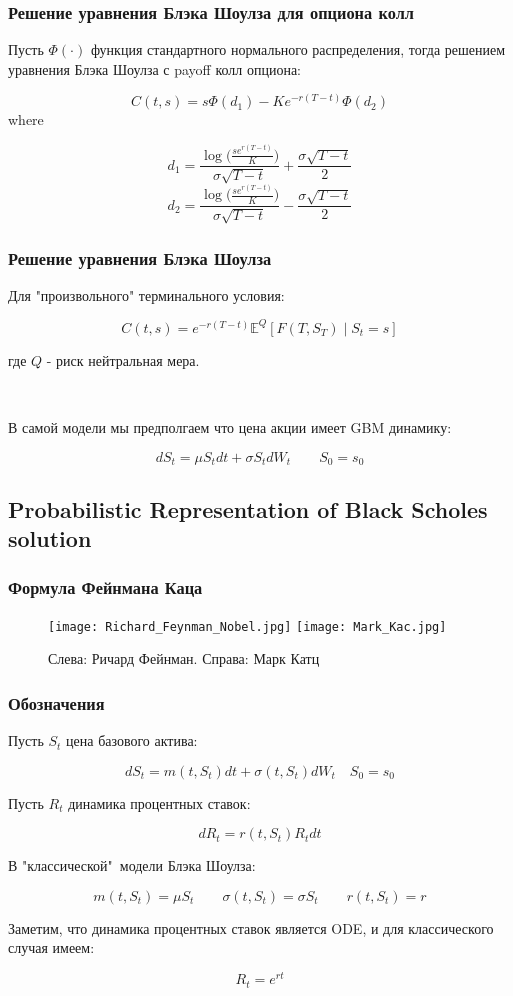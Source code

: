 \documentclass{beamer}
\begin{document}
\begin{frame}
\frametitle{Решение уравнения Блэка Шоулза для опциона колл}

Пусть $\Phi(\cdot)$ функция стандартного нормального распределения, тогда решением уравнения Блэка Шоулза с payoff колл опциона:

\[
C(t, s) = s \Phi(d_1) - K e^{-r(T - t)} \Phi(d_2)
\]
where

\[
d_1 = \frac{\log \bigg(\frac{s e^{r(T - t)}}{K}\bigg)}{\sigma \sqrt{T - t}} + \frac{\sigma \sqrt{T - t}}{2} 
\]
\[
d_2 = \frac{\log \bigg(\frac{s e^{r(T - t)}}{K}\bigg)}{\sigma \sqrt{T - t}} - \frac{\sigma \sqrt{T - t}}{2} 
\]

\end{frame}

\begin{frame}
\frametitle{Решение уравнения Блэка Шоулза}

Для "произвольного" терминального условия:

\[
C(t, s) = e^{-r(T-t)} \mathbb{E}^Q[F(T, S_T) \mid S_t = s]
\]

где \(Q\) - риск нейтральная мера.

\,

В самой модели мы предполгаем что цена акции имеет GBM динамику:

\[
d S_t = \mu S_t dt + \sigma S_t d W_t \quad \quad S_0 = s_0
\]

\end{frame}


\subsection{Probabilistic Representation of Black Scholes solution}
\begin{frame}
\frametitle{Формула Фейнмана Каца}
\begin{figure}
    \centering
    \texttt{[image: Richard\_Feynman\_Nobel.jpg]}
    \hfill
    \texttt{[image: Mark\_Kac.jpg]}
    \caption{Слева: Ричард Фейнман. Справа: Марк Катц}
\end{figure}
\end{frame}

\begin{frame}
\frametitle{Обозначения}

Пусть \(S_t\) цена базового актива:

\[ dS_t = m(t, S_t) dt + \sigma(t, S_t) dW_t \quad S_0 = s_0 \]

Пусть \(R_t\) динамика процентных ставок:

\[d R_t = r(t, S_t) R_t dt\]

В "классической"\ модели Блэка Шоулза:

\[m(t, S_t) = \mu S_t \quad \quad \sigma(t, S_t) = \sigma S_t \quad \quad r(t, S_t) = r\]

Заметим, что динамика процентных ставок является ODE, и для классического случая имеем:

\[R_t = e^{rt}\]

\end{frame}
\end{document}
